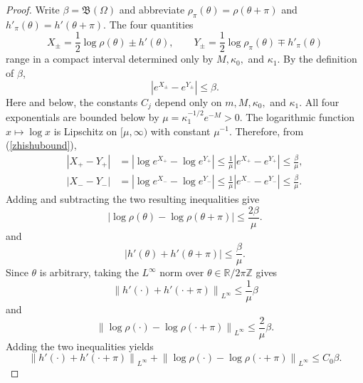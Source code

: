 \documentclass[12pt]{article}
\numberwithin{equation}{section}
\numberwithin{equation}{section}
\begin{document}
\begin{proof}
Write $\beta=\mathfrak B(\Omega)$ and abbreviate
$\rho_\pi(\theta)=\rho(\theta+\pi)$ and
$h'_\pi(\theta)=h'(\theta+\pi)$. The four quantities
\[
 X_\pm=\frac12\log\rho(\theta)\pm h'(\theta),
 \qquad
 Y_\pm=\frac12\log\rho_\pi(\theta)\mp h'_\pi(\theta)
\]
range in a compact interval determined only by
$M,\kappa_0,$ and $\kappa_1$. By the definition of $\beta$,
\begin{equation}\label{zhishubound}
 \left|e^{X_\pm}-e^{Y_\pm}\right|\leq\beta.
\end{equation}
Here and below, the constants $C_j$ depend only on
$m,M,\kappa_0,$ and $\kappa_1$.
All four exponentials are bounded below by
$\mu=\kappa_1^{-1/2}e^{-M}>0$.
The logarithmic function $x \mapsto \log x$ is Lipschitz on $[\mu, \infty)$ with constant $\mu^{-1}$.
Therefore, from (\ref{zhishubound}),
\begin{align*}
\left|X_+ - Y_+\right|
&= \left| \log e^{X_+} - \log e^{Y_+} \right|
\le \frac{1}{\mu} \left|e^{X_+} - e^{Y_+}\right|
\le \frac{\beta}{\mu}, \\
\left|X_- - Y_-\right|
&= \left| \log e^{X_-} - \log e^{Y_-} \right|
\le \frac{1}{\mu} \left|e^{X_-} - e^{Y_-}\right|
\le \frac{\beta}{\mu}.
\end{align*}
Adding and subtracting the two resulting inequalities give
\[
\left| \log \rho(\theta) - \log \rho(\theta+\pi) \right| \le \frac{2\beta}{\mu}.
\]
and
\[
\left| h'(\theta) + h'(\theta+\pi) \right| \le \frac{\beta}{\mu}.
\]
Since $\theta$ is arbitrary, taking the $L^\infty$ norm over $\theta \in \mathbb{R}/2\pi\mathbb{Z}$ gives
\[
\left\| h'(\cdot) + h'(\cdot+\pi)\right\|_{L^\infty} \le \frac{1}{\mu}\beta
\]
and
\[
\left\| \log \rho(\cdot) - \log \rho(\cdot+\pi)\right\|_{L^\infty} \le \frac{2}{\mu}\beta.
\]
Adding the two inequalities yields
\begin{equation}\label{eq:log-defect-control}
 \left\|h'(\cdot)+h'(\cdot+\pi)\right\|_{L^\infty}
 +\left\|\log\rho(\cdot)-\log\rho(\cdot+\pi)\right\|_{L^\infty}
 \leq C_0\beta.
\end{equation}


\end{proof}
\end{document}
